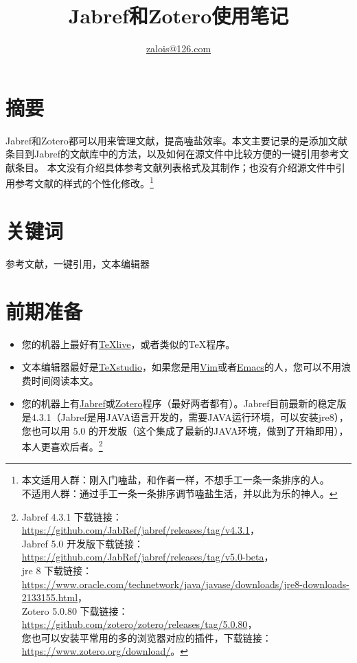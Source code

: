 \documentclass[cn,geye,cyan,normal,14pt]{elegantnote}
\title{Jabref和Zotero使用笔记}
\author{\href{mailto:zalois@126.com}{zalois@126.com}}
\institute{欢迎自由修改分享交流}
\date{\zhtoday}
\begin{document}
\maketitle
\section{摘要}
Jabref和Zotero都可以用来管理文献，提高嗑盐效率。本文主要记录的是添加文献条目到Jabref的文献库中的方法，以及如何在源文件中比较方便的一键引用参考文献条目。
本文没有介绍具体参考文献列表格式及其制作；也没有介绍源文件中引用参考文献的样式的个性化修改。\footnote{本文适用人群：刚入门嗑盐，和作者一样，不想手工一条一条排序的人。%
\\不适用人群：通过手工一条一条排序调节嗑盐生活，并以此为乐的神人。}
\section{关键词}
参考文献，一键引用，文本编辑器
\section{前期准备}
\begin{itemize}
	\item 您的机器上最好有\href{https://www.tug.org/texlive/}{\TeX live}，或者类似的\TeX 程序。
	\item 文本编辑器最好是\href{https://github.com/texstudio-org/texstudio/releases}{\TeX studio}，如果您是用\href{https://github.com/vim/vim/releases}{Vim}或者\href{https://ftp.gnu.org/gnu/emacs/}{Emacs}的人，您可以不用浪费时间阅读本文。
	\item 您的机器上有\href{https://github.com/JabRef/jabref/releases}{Jabref}或\href{https://github.com/zotero/zotero/releases}{Zotero}程序（最好两者都有）。Jabref目前最新的稳定版是4.3.1（Jabref是用JAVA语言开发的，需要JAVA运行环境，可以安装jre8），您也可以用 5.0 的开发版（这个集成了最新的JAVA环境，做到了开箱即用），本人更喜欢后者。\footnote{Jabref 4.3.1 下载链接：\url{https://github.com/JabRef/jabref/releases/tag/v4.3.1}，\\
		Jabref 5.0 开发版下载链接：\url{https://github.com/JabRef/jabref/releases/tag/v5.0-beta}，\\
		jre 8 下载链接：\url{https://www.oracle.com/technetwork/java/javase/downloads/jre8-downloads-2133155.html}，\\
		Zotero 5.0.80 下载链接：\url{https://github.com/zotero/zotero/releases/tag/5.0.80}，\\
		您也可以安装平常用的多的浏览器对应的插件，下载链接：\url{https://www.zotero.org/download/}。}
\end{itemize}
\end{document}
